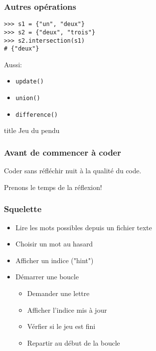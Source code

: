 \documentclass{beamer}
\begin{document}
\begin{frame}[fragile]
  \frametitle{Autres opérations}
\begin{lstlisting}
>>> s1 = {"un", "deux"}
>>> s2 = {"deux", "trois"}
>>> s2.intersection(s1)
# {"deux"}
\end{lstlisting}

Aussi:

\begin{itemize}
  \item \texttt{update()}
  \item \texttt{union()}
  \item \texttt{difference()}
\end{itemize}
\end{frame}

\begin{frame}[fragile]

  \begin{beamercolorbox}[sep=8pt,center,shadow=true,rounded=true]{title}
    Jeu du pendu
  \end{beamercolorbox}
\end{frame}


\begin{frame}[fragile]
  \frametitle{Avant de commencer à coder}

Coder sans réfléchir nuit à la qualité du code.

\vfill

Prenons le temps de la réflexion!
\end{frame}


\begin{frame}[fragile]
  \frametitle{Squelette}

\begin{itemize}
  \item Lire les mots possibles depuis un fichier texte
  \item Choisir un mot au hasard
  \item Afficher un indice ("hint")
  \item Démarrer une boucle
    \begin{itemize}
      \item Demander une lettre
      \item Afficher l'indice mis à jour
      \item Vérfier si le jeu est fini
      \item Repartir au début de la boucle
    \end{itemize}
\end{itemize}

\end{frame}
\end{document}
